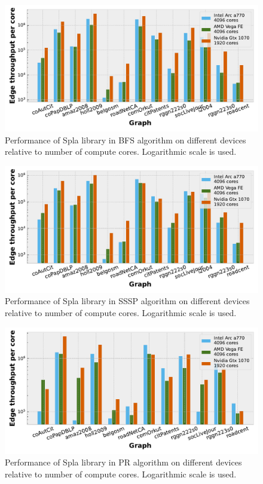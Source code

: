 \begin{figure}[tbp]
\centering
\includegraphics[width=0.9\linewidth]{plots/rq2_cores_bfs.pdf}
\caption{Performance of Spla library in BFS algorithm on different devices relative to number of compute cores. Logarithmic scale is used.}
\label{fig:rq2_bfs}
\end{figure}

\begin{figure}[tbp]
\centering
\includegraphics[width=0.9\linewidth]{plots/rq2_cores_sssp.pdf}
\caption{Performance of Spla library in SSSP algorithm on different devices relative to number of compute cores. Logarithmic scale is used.}
\label{fig:rq2_sssp}
\end{figure}

\begin{figure}[tbp]
\centering
\includegraphics[width=0.9\linewidth]{plots/rq2_cores_pr.pdf}
\caption{Performance of Spla library in PR algorithm on different devices relative to number of compute cores. Logarithmic scale is used.}
\label{fig:rq2_pr}
\end{figure}

